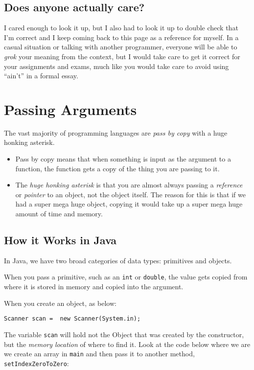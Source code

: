\subsection{Does anyone actually care?}

I cared enough to look it up, but I also had to look it up to double check that I'm correct and I keep coming back to this page as a reference for myself.  
In a casual situation or talking with another programmer, everyone will be able to \textit{grok} your meaning from the context, but I would take care to get it correct for your assignments and exams, much like you would take care to avoid using ``ain't'' in a formal essay.

\section{Passing Arguments}

The vast majority of programming languages are \textit{pass by copy} with a huge honking asterisk.
\begin{itemize}
	\item Pass by copy means that when something is input as the argument to a function, the function gets a copy of the thing you are passing to it.
	\item The \textit{huge honking asterisk} is that you are almost always passing a \textit{reference} or \textit{pointer} to an object, not the object itself.  The reason for this is that if we had a super mega huge object, copying it would take up a super mega huge amount of time and memory.
\end{itemize}



\subsection{How it Works in Java}
In Java, we have two broad categories of data types: primitives and objects.

When you pass a primitive, such as an \texttt{int} or \texttt{double}, the value gets copied from where it is stored in memory and copied into the argument.

When you create an object, as below:
\begin{verbatim}
Scanner scan =  new Scanner(System.in);
\end{verbatim}

The variable \texttt{scan} will hold not the Object that was created by the constructor, but the \textit{memory location} of where to find it.
Look at the code below where we are we create an array in \texttt{main} and then pass it to another method, \texttt{setIndexZeroToZero}:

